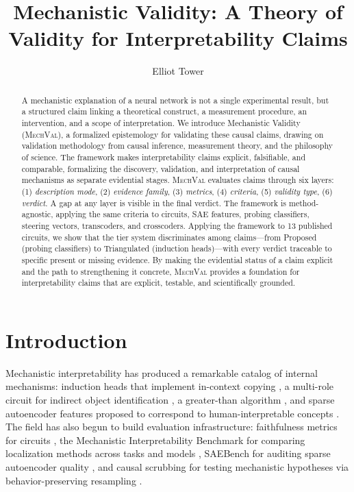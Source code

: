 \documentclass[10pt]{article}
\title{Mechanistic Validity: A Theory of Validity for Interpretability Claims}
\author[1]{Elliot Tower}
\affil[1]{Independent Researcher, \texttt{elliot@elliottower.com}}
\date{}
\newcommand{\mechval}{\textsc{MechVal}}
\begin{document}
\maketitle

\begin{abstract}
A mechanistic explanation of a neural network is not a single experimental result, but a structured claim linking a theoretical construct, a measurement procedure, an intervention, and a scope of interpretation. We introduce Mechanistic Validity (\mechval{}), a formalized epistemology for validating these causal claims, drawing on validation methodology from causal inference, measurement theory, and the philosophy of science. The framework makes interpretability claims explicit, falsifiable, and comparable, formalizing the discovery, validation, and interpretation of causal mechanisms as separate evidential stages. \mechval{} evaluates claims through six layers: (1) \emph{description mode}, (2) \emph{evidence family}, (3) \emph{metrics}, (4) \emph{criteria}, (5) \emph{validity type}, (6) \emph{verdict}. A gap at any layer is visible in the final verdict. The framework is method-agnostic, applying the same criteria to circuits, SAE features, probing classifiers, steering vectors, transcoders, and crosscoders. Applying the framework to 13 published circuits, we show that the tier system discriminates among claims---from Proposed (probing classifiers) to Triangulated (induction heads)---with every verdict traceable to specific present or missing evidence. By making the evidential status of a claim explicit and the path to strengthening it concrete, \mechval{} provides a foundation for interpretability claims that are explicit, testable, and scientifically grounded.
\end{abstract}

\section{Introduction}
\label{sec:intro}

Mechanistic interpretability has produced a remarkable catalog of internal mechanisms:
induction heads that implement in-context copying \citep{olsson2022context}, a multi-role
circuit for indirect object identification \citep{wang2023interpretability}, a greater-than
algorithm \citep{hanna2023greater}, and sparse autoencoder features proposed to correspond
to human-interpretable concepts \citep{cunningham2023sparse}. The field has also begun to
build evaluation infrastructure: faithfulness metrics for circuits
\citep{miller2024transformer}, the Mechanistic Interpretability Benchmark for comparing
localization methods across tasks and models \citep{mueller2025mib}, SAEBench for auditing
sparse autoencoder quality \citep{karvonen2025saebench}, and causal scrubbing for testing
mechanistic hypotheses via behavior-preserving resampling \citep{chan2022causal}.
\end{document}
